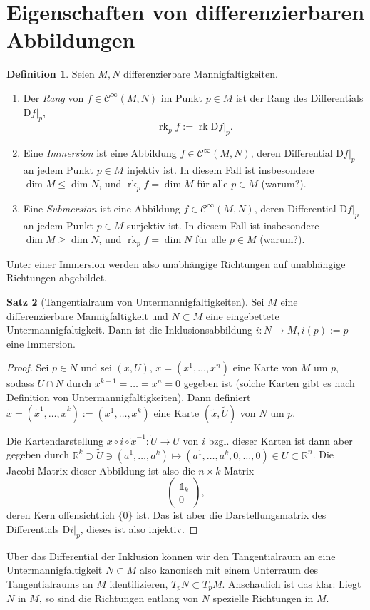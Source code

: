 \documentclass[a4paper]{scrbook}
\numberwithin{equation}{chapter}
\newcommand{\DD}{\mathrm{D}}
\DeclareMathOperator{\rk}{rk}
\newcommand{\R}{\mathbb{R}}
\newcommand{\sC}{\mathcal{C}^{\infty}}
\theoremstyle{definition}
\newtheorem{defn}{Definition}[section]
\newtheorem{satz}[defn]{Satz}
\begin{document}
\section{Eigenschaften von differenzierbaren Abbildungen}
\begin{defn}
	Seien $M,N$ differenzierbare Mannigfaltigkeiten.
	\begin{enumerate}[label=(\alph*)]
		\item Der \emph{Rang} von $f\in\sC(M,N)$ im Punkt $p \in M$ ist der Rang des Differentials $\left.\DD f\right|_p$,
		\[\rk_p f := \rk \left.\DD f\right|_p.\]
		\item Eine \emph{Immersion} ist eine Abbildung $f\in\sC(M,N)$, deren Differential $\left.\DD f\right|_p$ an jedem Punkt $p\in M$ injektiv ist. In diesem Fall ist insbesondere $\dim M \le \dim N$, und $\rk_p f = \dim M$ für alle $p\in M$ (warum?).
		\item Eine \emph{Submersion} ist eine Abbildung $f\in\sC(M,N)$, deren Differential $\left.\DD f\right|_p$ an jedem Punkt $p\in M$ surjektiv ist. In diesem Fall ist insbesondere $\dim M \ge \dim N$, und $\rk_p f = \dim N$ für alle $p\in M$ (warum?).
	\end{enumerate}
\end{defn}
Unter einer Immersion werden also unabhängige Richtungen auf unabhängige Richtungen abgebildet.

\begin{satz}[Tangentialraum von Untermannigfaltigkeiten]
	Sei $M$ eine differenzierbare Mannigfaltigkeit und $N \subset M$ eine eingebettete Untermannigfaltigkeit. Dann ist die Inklusionsabbildung $i\colon N \to M, i(p) := p$ eine Immersion.

	\begin{proof}
		Sei $p\in N$ und sei $(x,U)$, $x = (x^1,\dots,x^n)$ eine Karte von $M$ um $p$, sodass $U\cap N$ durch $x^{k+1} = \dots = x^n = 0$ gegeben ist (solche Karten gibt es nach Definition von Untermannigfaltigkeiten). Dann definiert $\tilde x = (\tilde x^1, \dots, \tilde x^k) := (x^1, \dots, x^k)$ eine Karte $(\tilde x, \tilde U)$ von $N$ um $p$.

		Die Kartendarstellung $x \circ i \circ \tilde x^{-1} \colon \tilde U \to U$ von $i$ bzgl. dieser Karten ist dann aber gegeben durch $\R^k \supset \tilde U \ni (a^1,\dots,a^k) \mapsto (a^1,\dots,a^k, 0,\dots,0) \in U \subset \R^n$. Die Jacobi-Matrix dieser Abbildung ist also die $n\times k$-Matrix
		\[\begin{pmatrix}
		\mathds{1}_k \\
		0
		\end{pmatrix},\]
		deren Kern offensichtlich $\{0\}$ ist. Das ist aber die Darstellungsmatrix des Differentials $\left.\DD i\right|_{p}$, dieses ist also injektiv.
	\end{proof}
\end{satz}
Über das Differential der Inklusion können wir den Tangentialraum an eine Untermannigfaltigkeit $N\subset M$ also kanonisch mit einem Unterraum des Tangentialraums an $M$ identifizieren, $T_pN \subset T_pM$. Anschaulich ist das klar: Liegt $N$ in $M$, so sind die Richtungen entlang von $N$ spezielle Richtungen in $M$.
\end{document}
